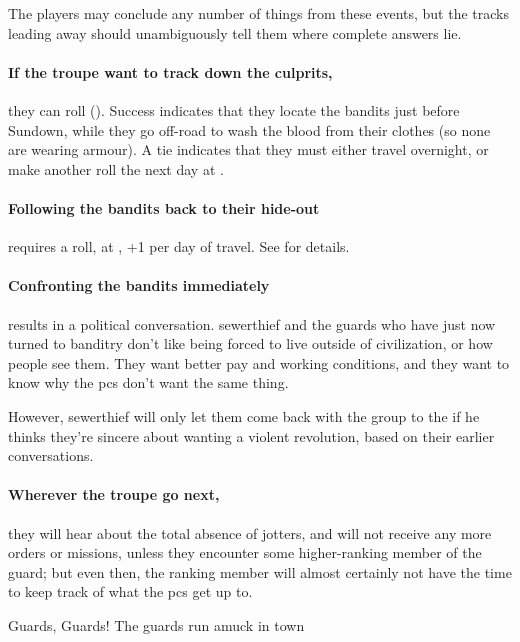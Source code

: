 The players may conclude any number of things from these events, but the tracks leading away should unambiguously tell them where complete answers lie.

\paragraph{If the troupe want to track down the culprits,}
they can roll  (\tn[8]).
Success indicates that they locate the bandits just before Sundown, while they go off-road to wash the blood from their clothes (so none are wearing armour).
A tie indicates that they must either travel overnight, or make another roll the next day at \tn[10].

\paragraph{Following the bandits back to their hide-out}
requires a  roll, at \tn[10], +1 per day of travel.
See  for details.

\paragraph{Confronting the bandits immediately}
results in a political conversation.
\Gls{sewerthief} and the \glspl{guard} who have just now turned to banditry don't like being forced to live outside of civilization, or how people see them.
They want better pay and working conditions, and they want to know why the \glspl{pc} don't want the same thing.

However, \gls{sewerthief} will only let them come back with the group to the  if he thinks they're sincere about wanting a violent revolution, based on their earlier conversations.

\paragraph{Wherever the troupe go next,}
they will hear about the total absence of \glspl{jotter}, and will not receive any more orders or missions, unless they encounter some higher-ranking member of the \gls{guard}; but even then, the ranking member will almost certainly not have the time to keep track of what the \glspl{pc} get up to.

{Guards, Guards!}%
{The \glspl{guard} run amuck in \gls{town}}%


